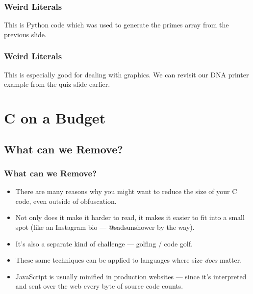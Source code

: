 \documentclass[xcolor]{beamer}
\begin{document}
\begin{frame}
	\frametitle{Weird Literals}
	
	This is Python code which was used to generate the primes array from the previous slide.
	
	
\end{frame}

\begin{frame}
	\frametitle{Weird Literals}
	\pause
	
	This is especially good for dealing with graphics. We can revisit our DNA printer example from the quiz slide earlier.
	\pause
	
	
\end{frame}

\section{C on a Budget}

\subsection{What can we Remove?}

\begin{frame}
	\frametitle{What can we Remove?}
	\pause
	
	\begin{itemize}
		\item There are many reasons why you might want to reduce the size of your C code, even outside of obfuscation.
		\pause
		
		\item Not only does it make it harder to read, it makes it easier to fit into a small spot (like an Instagram bio --- @sadsunshower by the way).
		\pause
		
		\item It's also a separate kind of challenge --- golfing / code golf.
		\pause
		
		\item These same techniques can be applied to languages where size \textit{does} matter.
		\pause
		
		\item JavaScript is usually minified in production websites \pause --- since it's interpreted and sent over the web every byte of source code counts.
	\end{itemize}
\end{frame}
\end{document}
